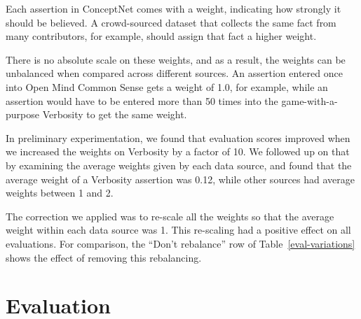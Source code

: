 \documentclass[letterpaper]{article}
\begin{document}
Each assertion in ConceptNet comes with a weight, indicating how strongly it
should be believed. A crowd-sourced dataset that collects the same fact from
many contributors, for example, should assign that fact a higher weight.

There is no absolute scale on these weights, and as a result, the weights can
be unbalanced when compared across different sources. An assertion entered once
into Open Mind Common Sense gets a weight of 1.0, for example, while an
assertion would have to be entered more than 50 times into the
game-with-a-purpose Verbosity to get the same weight.

In preliminary experimentation, we found that evaluation scores improved when
we increased the weights on Verbosity by a factor of 10. We followed up on that
by examining the average weights given by each data source, and found that the
average weight of a Verbosity assertion was 0.12, while other sources had
average weights between 1 and 2.

The correction we applied was to re-scale all the weights so that the average
weight within each data source was 1. This re-scaling had a positive effect
on all evaluations. For comparison, the ``Don't rebalance'' row of
Table~\ref{eval-variations} shows the effect of removing this rebalancing.

\section{Evaluation}
\end{document}
